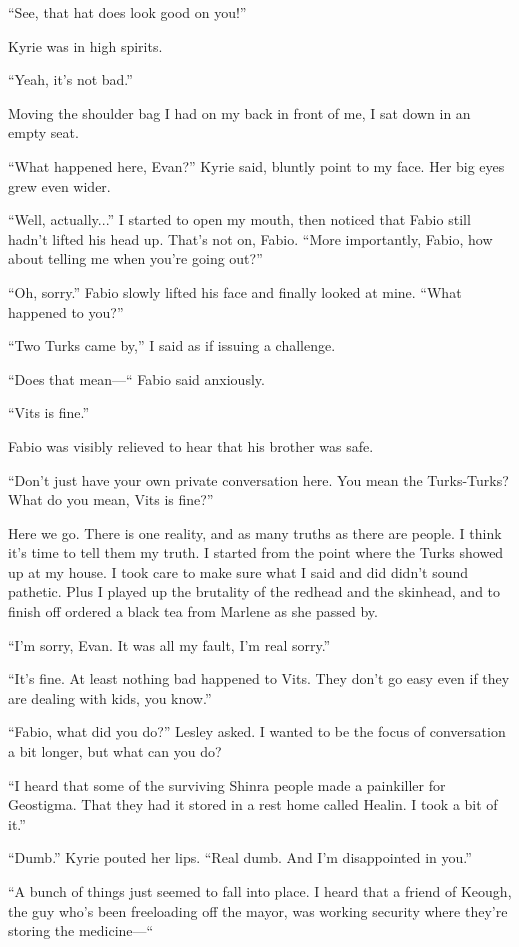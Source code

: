 \documentclass[oneside]{book}
\begin{document}
“See, that hat does look good on you!”

Kyrie was in high spirits.

“Yeah, it’s not bad.”

Moving the shoulder bag I had on my back in front of me, I sat down in an empty seat.

“What happened here, Evan?” Kyrie said, bluntly point to my face. Her big eyes grew even wider.

“Well, actually...” I started to open my mouth, then noticed that Fabio still hadn’t lifted his head up. That’s not on, Fabio. “More importantly, Fabio, how about telling me when you’re going out?”

“Oh, sorry.” Fabio slowly lifted his face and finally looked at mine. “What happened to you?”

“Two Turks came by,” I said as if issuing a challenge.

“Does that mean—“ Fabio said anxiously.

“Vits is fine.”

Fabio was visibly relieved to hear that his brother was safe.

“Don’t just have your own private conversation here. You mean the Turks-Turks? What do you mean, Vits is fine?”

Here we go. There is one reality, and as many truths as there are people. I think it’s time to tell them my truth. I started from the point where the Turks showed up at my house. I took care to make sure what I said and did didn’t sound pathetic. Plus I played up the brutality of the redhead and the skinhead, and to finish off ordered a black tea from Marlene as she passed by.

“I’m sorry, Evan. It was all my fault, I’m real sorry.”

“It’s fine. At least nothing bad happened to Vits. They don’t go easy even if they are dealing with kids, you know.”

“Fabio, what did you do?” Lesley asked. I wanted to be the focus of conversation a bit longer, but what can you do?

“I heard that some of the surviving Shinra people made a painkiller for Geostigma. That they had it stored in a rest home called Healin. I took a bit of it.”

“Dumb.” Kyrie pouted her lips. “Real dumb. And I’m disappointed in you.”

“A bunch of things just seemed to fall into place. I heard that a friend of Keough, the guy who’s been freeloading off the mayor, was working security where they’re storing the medicine—“
\end{document}
